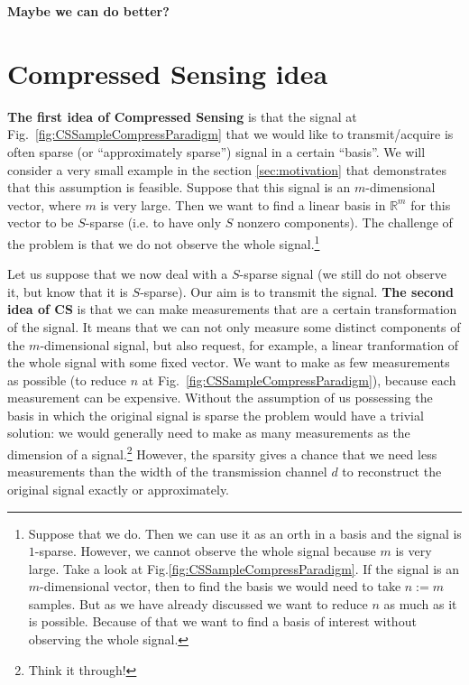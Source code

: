 \documentclass[11pt]{article}
\numberwithin{equation}{section}
\theoremstyle{definition}
\begin{document}
\begin{center}
    \bf \color{red} Maybe we can do better?
\end{center}

\section{Compressed Sensing idea}
\textbf{The first idea of Compressed Sensing} is that the signal at Fig.~\ref{fig:CSSampleCompressParadigm} that we would like to transmit/acquire is often sparse (or ``approximately sparse'') signal in a certain ``basis''.
We will consider a very small example in the section \ref{sec:motivation} that demonstrates that this assumption is feasible.
Suppose that this signal is an $m$-dimensional vector, where $m$ is very large.
Then we want to find a linear basis in $\mathbb R^m$ for this vector to be $S$-sparse (i.e. to have only $S$ nonzero components).
The challenge of the problem is that we do not observe the whole signal.\footnote{
    Suppose that we do.
    Then we can use it as an orth in a basis and the signal is $1$-sparse.
    However, we cannot observe the whole signal because $m$ is very large.
    Take a look at Fig.\ref{fig:CSSampleCompressParadigm}.
    If the signal is an $m$-dimensional vector, then to find the basis we would need to take $n := m$ samples.
    But as we have already discussed we want to reduce $n$ as much as it is possible.
    Because of that we want to find a basis of interest without observing the whole signal.
}

Let us suppose that we now deal with a $S$-sparse signal (we still do not observe it, but know that it is $S$-sparse).
Our aim is to transmit the signal.
\textbf{The second idea of CS} is that we can make measurements that are a certain transformation of the signal.
It means that we can not only measure some distinct components of the $m$-dimensional signal,
but also request, for example, a linear tranformation of the whole signal with some fixed vector.
We want to make as few measurements as possible (to reduce $n$ at Fig.~\ref{fig:CSSampleCompressParadigm}), because each measurement can be expensive.
Without the assumption of us possessing the basis in which the original signal is sparse the problem would have a trivial solution:
we would generally need to make as many measurements as the dimension of a signal.\footnote{Think it through!}
However, the sparsity gives a chance that we need less measurements than the width of the transmission channel $d$
to reconstruct the original signal exactly or approximately.
\end{document}
